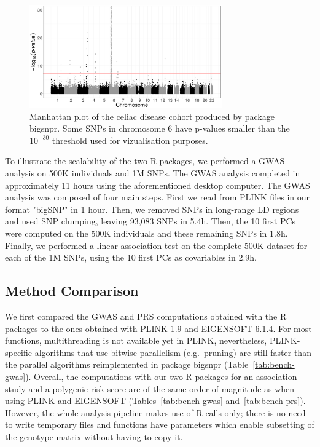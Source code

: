\documentclass{bioinfo}
\begin{document}
\begin{figure}[!tpb]
\centerline{\includegraphics[width=235pt]{celiac-gwas-cut}}
\caption{Manhattan plot of the celiac disease cohort produced by package bigsnpr. Some SNPs in chromosome 6 have p-values smaller than the $10^{-30}$ threshold used for vizualisation purposes.}\label{fig:gwas}
\end{figure}

To illustrate the scalability of the two R packages, we performed a GWAS analysis on 500K individuals and 1M SNPs. The GWAS analysis completed in approximately 11 hours using the aforementioned desktop computer. The GWAS analysis was composed of four main steps. 
First we read from PLINK files in our format "bigSNP" in 1 hour.
Then, we removed SNPs in long-range LD regions and used SNP clumping, leaving 93,083 SNPs in 5.4h. Then, the 10 first PCs were computed on the 500K individuals and these remaining SNPs in 1.8h. Finally, we performed a linear association test on the complete 500K dataset for each of the 1M SNPs, using the 10 first PCs as covariables in 2.9h.

\subsection{Method Comparison}

We first compared the GWAS and PRS computations obtained with the R packages to the ones obtained with PLINK 1.9 and EIGENSOFT 6.1.4.
For most functions, multithreading is not available yet in PLINK, nevertheless, PLINK-specific algorithms that use bitwise parallelism (e.g.\ pruning) are still faster than the parallel algorithms reimplemented in package bigsnpr (Table~\ref{tab:bench-gwas}). Overall, the computations with our two R packages for an association study and a polygenic risk score are of the same order of magnitude as when using PLINK and EIGENSOFT (Tables~\ref{tab:bench-gwas} and~\ref{tab:bench-prs}). However, the whole analysis pipeline makes use of R calls only; there is no need to write temporary files and functions have parameters which enable subsetting of the genotype matrix without having to copy it. 
\end{document}
